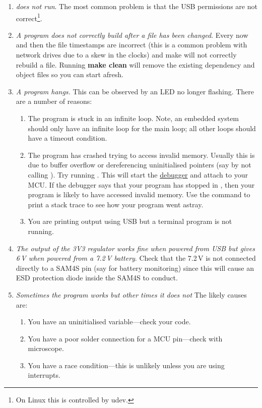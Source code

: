 \begin{enumerate}
\item
  \emph{ does not run}. The most common problem is
  that the USB permissions are not correct\footnote{On Linux this is
    controlled by udev.}.

\item
  \emph{A program does not correctly build after a file has been
    changed}. Every now and then the file timestamps are incorrect
  (this is a common problem with network drives due to a skew in the
  clocks) and make will not correctly rebuild a file. Running
  \textbf{make clean} will remove the existing dependency and object
  files so you can start afresh.

\item
  \emph{A program hangs.} This can be observed by an LED no longer
  flashing. There are a number of reasons:

  \begin{enumerate}
  \item
    The program is stuck in an infinite loop. Note, an embedded system
    should only have an infinite loop for the main loop; all other loops
    should have a timeout condition.
  \item
    The program has crashed trying to access invalid memory. Usually
    this is due to buffer overflow or dereferencing uninitialised
    pointers (say by not calling ). Try running
    .  This will start the
    \protect\hyperref[debugging]{debugger} and attach to your MCU. If
    the debugger says that your program has stopped in
    , then your program is likely to have
    accessed invalid memory. Use the  command to print a
    stack trace to see how your program went astray.

  \item You are printing output using USB but a terminal program is
    not running.
  \end{enumerate}

\item
  \emph{The output of the 3V3 regulator works fine when powered from
    USB but gives 6\,V when powered from a 7.2\,V battery}. Check that
  the 7.2\,V is not connected directly to a SAM4S pin (say for battery
  monitoring) since this will cause an ESD protection diode inside the
  SAM4S to conduct.

\item \emph{Sometimes the program works but other times it does not}
  The likely causes are:
  \begin{enumerate}
  \item You have an uninitialised variable---check your code.

  \item You have a poor solder connection for a MCU pin---check with
    microscope.

  \item You have a race condition---this is unlikely unless you are
    using interrupts.
  \end{enumerate}

\end{enumerate}
